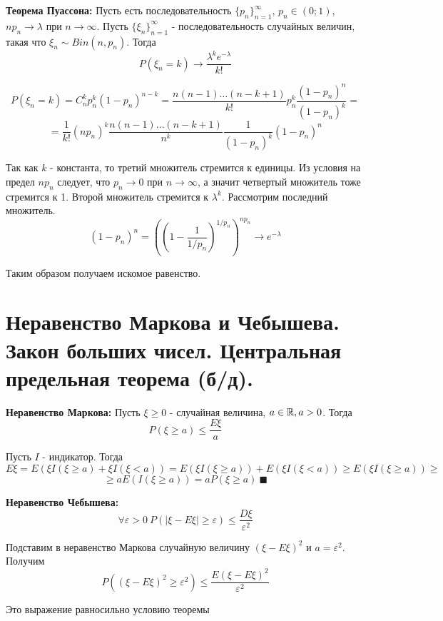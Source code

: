 \par \textbf{Теорема Пуассона:} Пусть есть последовательность $\{p_n\}_{n=1}^\infty$, $p_n \in (0;1)$, $np_n \rightarrow \lambda$ при $n \rightarrow \infty$. Пусть $\{\xi_n\}_{n=1}^\infty$ - последовательность случайных величин, такая что $\xi_n \sim Bin(n, p_n)$. Тогда $$P(\xi_n=k)\rightarrow \frac{\lambda^k e^{-\lambda}}{k!}$$
\par \Proof $$P(\xi_n=k)=C_n^kp_n^k(1-p_n)^{n-k}=\frac{n(n-1)\ldots(n-k+1)}{k!}p_n^k\frac{(1-p_n)^n}{(1-p_n)^k}=$$
$$=\frac{1}{k!}(np_n)^k\frac{n(n-1)\ldots(n-k+1)}{n^k}\frac{1}{(1-p_n)^k}(1-p_n)^n$$
\par Так как $k$ - константа, то третий множитель стремится к единицы. Из условия на предел $np_n$ следует, что $p_n \rightarrow 0$ при $n \rightarrow \infty$, а значит четвертый множитель тоже стремится к 1. Второй множитель стремится к $\lambda^k$. Рассмотрим последний множитель.
$$(1-p_n)^n=((1-\frac{1}{1/p_n})^{1/p_n})^{np_n}\rightarrow e^{-\lambda}$$
\par Таким образом получаем искомое равенство. \EndProof
\newpage{}

\section{Неравенство Маркова и Чебышева. Закон больших чисел. Центральная предельная теорема (б/д).}

\par \textbf{Неравенство Маркова:} Пусть $\xi\geq 0$ - случайная величина, $a \in \mathbb{R}, a > 0$. Тогда $$P(\xi \geq a) \leq \frac{E\xi}{a}$$
\par \Proof Пусть $I$ - индикатор. Тогда $$E\xi=E(\xi I(\xi \geq a) + \xi I(\xi < a))=E(\xi I(\xi \geq a))+E(\xi I(\xi < a)) \geq E(\xi I(\xi \geq a)) \geq$$ $$\geq a E(I(\xi \geq a))=aP(\xi \geq a) \: \blacksquare$$

\par \textbf{Неравенство Чебышева:} $$\forall \varepsilon > 0 \: P(|\xi - E\xi| \geq \varepsilon)\leq \frac{D\xi}{\varepsilon^2}$$
\par \Proof Подставим в неравенство Маркова случайную величину $(\xi - E\xi)^2$ и $a=\varepsilon^2$. Получим
$$P((\xi-E\xi)^2 \geq \varepsilon^2) \leq \frac{E(\xi-E\xi)^2}{\varepsilon^2}$$
\par Это выражение равносильно условию теоремы \EndProof

